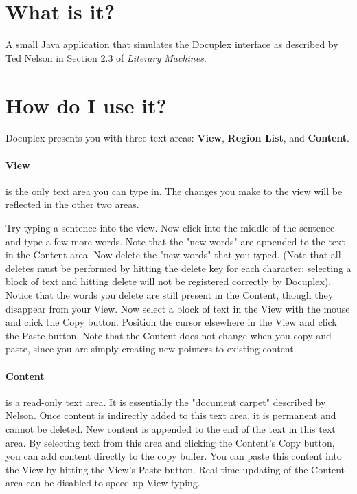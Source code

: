\documentclass[12pt]{article}
\begin{document}
\section{What is it?}
A small Java application that simulates the Docuplex interface as described by Ted Nelson in Section 2.3 of {\it Literary Machines}.




\section{How do I use it?}

Docuplex presents you with three text areas: {\bf View}, {\bf Region List}, and {\bf Content}.

\paragraph{View} is the only text area you can type in.  The changes you make to the view will be reflected in the other two areas.

Try typing a sentence into the view.  Now click into the middle of the sentence and type a few more words.  Note that the "new words" are appended to the text in the Content area.  Now delete the "new words" that you typed. (Note that all deletes must be performed by hitting the delete key for each character:  selecting a block of text and hitting delete will not be registered correctly by Docuplex).  Notice that the words you delete are still present in the Content, though they disappear from your View.  Now select a block of text in the View with the mouse and click the Copy button.  Position the cursor elsewhere in the View and click the Paste button.  Note that the Content does not change when you copy and paste, since you are simply creating new pointers to existing content.

\paragraph{Content} is a read-only text area.  It is essentially the "document carpet" described by Nelson.  Once content is indirectly added to this text area, it is permanent and cannot be deleted.  New content is appended to the end of the text in this text area.  By selecting text from this area and clicking the Content's Copy button, you can add content directly to the copy buffer.  You can paste this content into the View by hitting the View's Paste button.  Real time updating of the Content area can be disabled to speed up View typing.
\end{document}
